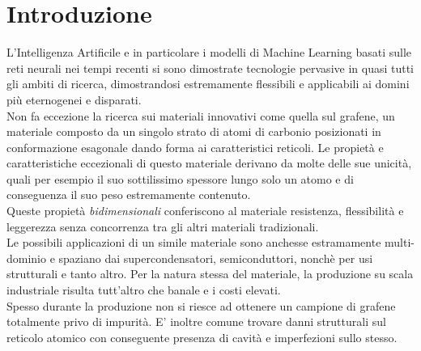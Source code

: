 \documentclass[12pt,a4paper,openright,twoside]{report}
\begin{document}
\chapter*{Introduzione}                 %
L'Intelligenza Artificile e in particolare i modelli di Machine Learning basati sulle reti neurali nei tempi recenti si sono dimostrate tecnologie pervasive in quasi tutti gli ambiti di ricerca, dimostrandosi estremamente flessibili e applicabili ai domini più eternogenei e disparati. \\

Non fa eccezione la ricerca sui materiali innovativi come quella sul grafene, un materiale composto da un singolo strato di atomi di carbonio posizionati in conformazione esagonale dando forma ai caratteristici reticoli.
Le propietà e caratteristiche eccezionali di questo materiale derivano da molte delle sue unicità, quali per esempio il suo sottilissimo spessore lungo solo un atomo e di conseguenza il suo peso estremamente contenuto. \\
Queste propietà \emph{bidimensionali} conferiscono al materiale resistenza, flessibilità e leggerezza senza concorrenza tra gli altri materiali tradizionali. \\
Le possibili applicazioni di un simile materiale sono anchesse estramamente multi-dominio e spaziano dai supercondensatori, semiconduttori, nonchè per usi strutturali e tanto altro. 
Per la natura stessa del materiale, la produzione su scala industriale risulta tutt'altro che banale e i costi elevati. \\
Spesso durante la produzione non si riesce ad ottenere un campione di grafene totalmente privo di impurità. E' inoltre comune trovare danni strutturali sul reticolo atomico con conseguente presenza di cavità e imperfezioni sullo stesso. \\
\end{document}
